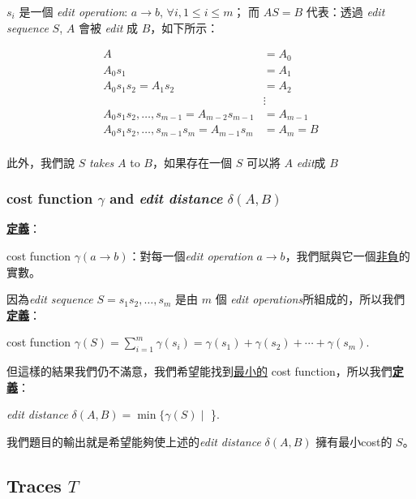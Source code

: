 \documentclass[15pt]{extarticle}
\begin{document}
$s_i$ 是一個 \textit{edit operation}: $a \to b$, $\forall i, 1 \le i \le m$；
而 $AS = B$ 代表：透過 \textit{edit sequence} $S$, $A$ 會被 \textit{edit} 成 $B$，如下所示：

\begin{align*}
    A &= A_0 \\
    A_0s_1 &= A_1 \\
    A_0s_1s_2 = A_1s_2 &= A_2 \\
    &\vdots \\
    A_0s_1s_2, \dots,s_{m - 1} = A_{m - 2}s_{m - 1} &= A_{m - 1} \\
    A_0s_1s_2, \dots,s_{m - 1}s_m = A_{m - 1}s_m &= A_m = B \\
\end{align*}

此外，我們說 $S$ \textit{takes} $A$ to $B$，如果存在一個 $S$ 可以將 $A$ \textit{edit}成 $B$

\subsubsection{cost function $\gamma$ and \textit{edit distance} $\delta(A, B)$} 

\textbf{\uline{定義}}：

\begin{center}
    cost function $\gamma(a \to b)$：對每一個\textit{edit operation} $a \to b$，我們賦與它一個\uline{非負}的實數。 
\end{center}

因為\textit{edit sequence} $S = s_1s_2, \dots, s_m$ 是由 $m$ 個 \textit{edit operations}所組成的，所以我們\textbf{\uline{定義}}：

\begin{center}
    cost function $\gamma(S) = \sum_{i = 1}^m\gamma(s_i) = \gamma(s_1) + \gamma(s_2) + \cdots + \gamma(s_m).$
\end{center}

但這樣的結果我們仍不滿意，我們希望能找到\uline{最小的} cost function，所以我們\textbf{\uline{定義}}：

\begin{center}
\textit{edit distance} $\delta(A, B) = \min\{\gamma(S)\mid$ \}.
\end{center}

我們題目的輸出就是希望能夠使上述的\textit{edit distance} $\delta(A, B)$ 擁有最小cost的 $S$。

\subsection{Traces $T$}
\end{document}
